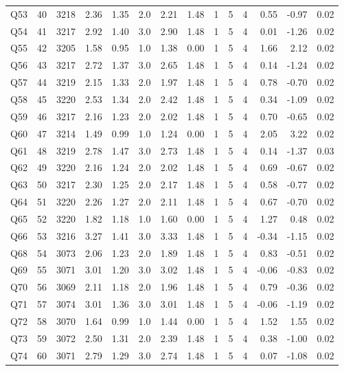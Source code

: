 \documentclass[
]{report}
\begin{document}
\begin{table}
\begin{tabular}[t]{lrrrrrrrrrrrrr}
Q53 & 40 & 3218 & 2.36 & 1.35 & 2.0 & 2.21 & 1.48 & 1 & 5 & 4 & 0.55 & -0.97 & 0.02\\
\addlinespace
Q54 & 41 & 3217 & 2.92 & 1.40 & 3.0 & 2.90 & 1.48 & 1 & 5 & 4 & 0.01 & -1.26 & 0.02\\
Q55 & 42 & 3205 & 1.58 & 0.95 & 1.0 & 1.38 & 0.00 & 1 & 5 & 4 & 1.66 & 2.12 & 0.02\\
Q56 & 43 & 3217 & 2.72 & 1.37 & 3.0 & 2.65 & 1.48 & 1 & 5 & 4 & 0.14 & -1.24 & 0.02\\
Q57 & 44 & 3219 & 2.15 & 1.33 & 2.0 & 1.97 & 1.48 & 1 & 5 & 4 & 0.78 & -0.70 & 0.02\\
Q58 & 45 & 3220 & 2.53 & 1.34 & 2.0 & 2.42 & 1.48 & 1 & 5 & 4 & 0.34 & -1.09 & 0.02\\
\addlinespace
Q59 & 46 & 3217 & 2.16 & 1.23 & 2.0 & 2.02 & 1.48 & 1 & 5 & 4 & 0.70 & -0.65 & 0.02\\
Q60 & 47 & 3214 & 1.49 & 0.99 & 1.0 & 1.24 & 0.00 & 1 & 5 & 4 & 2.05 & 3.22 & 0.02\\
Q61 & 48 & 3219 & 2.78 & 1.47 & 3.0 & 2.73 & 1.48 & 1 & 5 & 4 & 0.14 & -1.37 & 0.03\\
Q62 & 49 & 3220 & 2.16 & 1.24 & 2.0 & 2.02 & 1.48 & 1 & 5 & 4 & 0.69 & -0.67 & 0.02\\
Q63 & 50 & 3217 & 2.30 & 1.25 & 2.0 & 2.17 & 1.48 & 1 & 5 & 4 & 0.58 & -0.77 & 0.02\\
\addlinespace
Q64 & 51 & 3220 & 2.26 & 1.27 & 2.0 & 2.11 & 1.48 & 1 & 5 & 4 & 0.67 & -0.70 & 0.02\\
Q65 & 52 & 3220 & 1.82 & 1.18 & 1.0 & 1.60 & 0.00 & 1 & 5 & 4 & 1.27 & 0.48 & 0.02\\
Q66 & 53 & 3216 & 3.27 & 1.41 & 3.0 & 3.33 & 1.48 & 1 & 5 & 4 & -0.34 & -1.15 & 0.02\\
Q68 & 54 & 3073 & 2.06 & 1.23 & 2.0 & 1.89 & 1.48 & 1 & 5 & 4 & 0.83 & -0.51 & 0.02\\
Q69 & 55 & 3071 & 3.01 & 1.20 & 3.0 & 3.02 & 1.48 & 1 & 5 & 4 & -0.06 & -0.83 & 0.02\\
\addlinespace
Q70 & 56 & 3069 & 2.11 & 1.18 & 2.0 & 1.96 & 1.48 & 1 & 5 & 4 & 0.79 & -0.36 & 0.02\\
Q71 & 57 & 3074 & 3.01 & 1.36 & 3.0 & 3.01 & 1.48 & 1 & 5 & 4 & -0.06 & -1.19 & 0.02\\
Q72 & 58 & 3070 & 1.64 & 0.99 & 1.0 & 1.44 & 0.00 & 1 & 5 & 4 & 1.52 & 1.55 & 0.02\\
Q73 & 59 & 3072 & 2.50 & 1.31 & 2.0 & 2.39 & 1.48 & 1 & 5 & 4 & 0.38 & -1.00 & 0.02\\
Q74 & 60 & 3071 & 2.79 & 1.29 & 3.0 & 2.74 & 1.48 & 1 & 5 & 4 & 0.07 & -1.08 & 0.02\\

\end{tabular}
\end{table}
\end{document}
